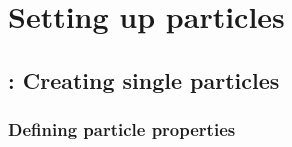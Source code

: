 %  
%   
%  
%  
%
\chapter{Setting up particles}
\label{chap:part}

\section{: Creating single particles}

\subsection{Defining particle properties}
\label{ssec:particleproperties}

